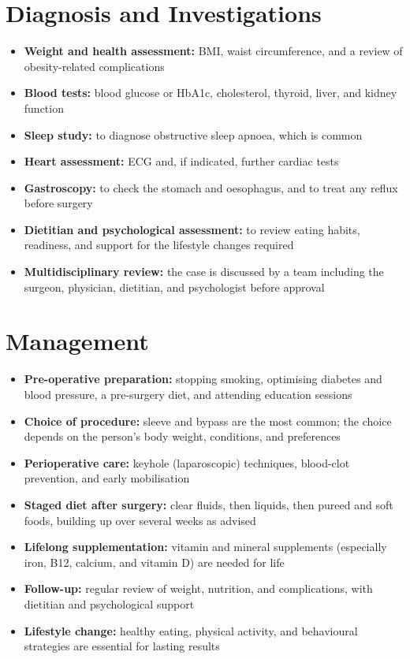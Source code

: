 \section*{Diagnosis and Investigations}
\begin{itemize}
    \item \textbf{Weight and health assessment:} BMI, waist circumference, and a review of obesity-related complications
    \item \textbf{Blood tests:} blood glucose or HbA1c, cholesterol, thyroid, liver, and kidney function
    \item \textbf{Sleep study:} to diagnose obstructive sleep apnoea, which is common
    \item \textbf{Heart assessment:} ECG and, if indicated, further cardiac tests
    \item \textbf{Gastroscopy:} to check the stomach and oesophagus, and to treat any reflux before surgery
    \item \textbf{Dietitian and psychological assessment:} to review eating habits, readiness, and support for the lifestyle changes required
    \item \textbf{Multidisciplinary review:} the case is discussed by a team including the surgeon, physician, dietitian, and psychologist before approval
\end{itemize}

\section*{Management}
\begin{itemize}
    \item \textbf{Pre-operative preparation:} stopping smoking, optimising diabetes and blood pressure, a pre-surgery diet, and attending education sessions
    \item \textbf{Choice of procedure:} sleeve and bypass are the most common; the choice depends on the person's body weight, conditions, and preferences
    \item \textbf{Perioperative care:} keyhole (laparoscopic) techniques, blood-clot prevention, and early mobilisation
    \item \textbf{Staged diet after surgery:} clear fluids, then liquids, then pureed and soft foods, building up over several weeks as advised
    \item \textbf{Lifelong supplementation:} vitamin and mineral supplements (especially iron, B12, calcium, and vitamin D) are needed for life
    \item \textbf{Follow-up:} regular review of weight, nutrition, and complications, with dietitian and psychological support
    \item \textbf{Lifestyle change:} healthy eating, physical activity, and behavioural strategies are essential for lasting results
\end{itemize}

